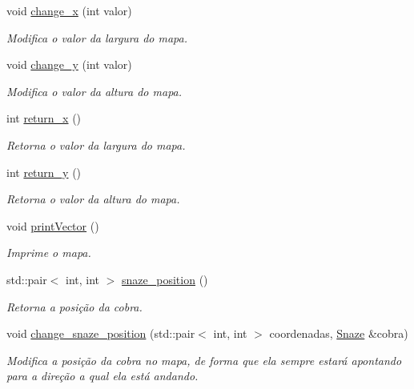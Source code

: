 \begin{DoxyCompactItemize}
void \hyperlink{classMaps_a0ed4b3dd55951294a26ef3c54ede92fb}{change\+\_\+x} (int valor)
\begin{DoxyCompactList}\small\item\em Modifica o valor da largura do mapa. \end{DoxyCompactList}\item 
void \hyperlink{classMaps_ae66359ffa0d8570dd5d6329a5733047d}{change\+\_\+y} (int valor)
\begin{DoxyCompactList}\small\item\em Modifica o valor da altura do mapa. \end{DoxyCompactList}\item 
int \hyperlink{classMaps_ab77f2fa68caba59dca05fb403edc9099}{return\+\_\+x} ()
\begin{DoxyCompactList}\small\item\em Retorna o valor da largura do mapa. \end{DoxyCompactList}\item 
int \hyperlink{classMaps_a93da8a525b47eabad3a9f31ab8c5cfc5}{return\+\_\+y} ()
\begin{DoxyCompactList}\small\item\em Retorna o valor da altura do mapa. \end{DoxyCompactList}\item 
void \hyperlink{classMaps_a068e03c298dd238deb000702dec960e8}{print\+Vector} ()
\begin{DoxyCompactList}\small\item\em Imprime o mapa. \end{DoxyCompactList}\item 
std\+::pair$<$ int, int $>$ \hyperlink{classMaps_a5db28b22a32d650536c264c0354e3e72}{snaze\+\_\+position} ()
\begin{DoxyCompactList}\small\item\em Retorna a posição da cobra. \end{DoxyCompactList}\item 
void \hyperlink{classMaps_a441ea7041e0a6c21e546417d17a5c744}{change\+\_\+snaze\+\_\+position} (std\+::pair$<$ int, int $>$ coordenadas, \hyperlink{classSnaze}{Snaze} \&cobra)
\begin{DoxyCompactList}\small\item\em Modifica a posição da cobra no mapa, de forma que ela sempre estará apontando para a direção a qual ela está andando. \end{DoxyCompactList}\end{DoxyCompactItemize}
